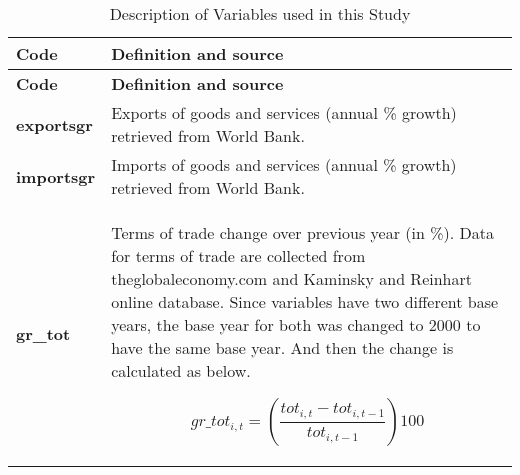 
\begin{xltabular}{\linewidth}{ l | X }
    \caption{Description of Variables used in this Study} 
   \label{table: vardescription}\\
   \hline \hline
  
  \textbf{\normalsize Code} & \textbf{\normalsize Definition and source}  \\
   \hline 
  \endfirsthead
   \hline \hline
  
  \textbf{\normalsize Code} & \textbf{\normalsize Definition and source}  \\
   \hline 
  \endhead
  
  \textbf{exportsgr} & Exports of goods and services (annual \% growth) retrieved from World Bank. \\ \hline 
  
  
  \textbf{importsgr} & Imports of goods and services (annual \% growth) retrieved from World Bank.\\ \hline 
  
  
  \textbf{gr\_tot} & Terms of trade change over previous year (in \%).  Data for terms of trade are collected from theglobaleconomy.com  and Kaminsky and Reinhart online database. Since variables have two different base years, the base year for both was changed to 2000 to have the same base year. And then the change is calculated as below.  
  
  \begin{equation}
  gr\_tot_{i,t} = (\frac{tot_{i,t}- tot_{i,t-1}}{tot_{i,t-1}})100
  \end{equation}
  \\ \hline
  
  \end{xltabular}